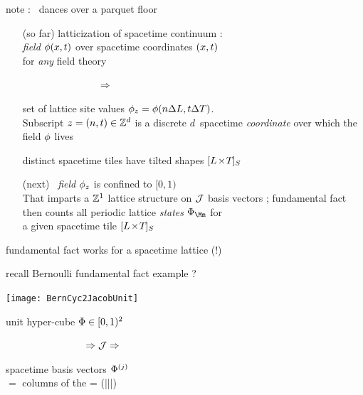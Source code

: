 \begin{frame}{note : \catlatt\ dances over a parquet floor}
\begin{itemize}
  \item[(so far)]
latticization of spacetime continuum :\\
{\color{blue}\emph{field}} $\ssp(x,\zeit)$ over spacetime coordinates
$(x,\zeit)$\\ for {\color{blue}\emph{any}} field theory

~~~~~~~~~~~~~~~$\Rightarrow$

set of lattice site values $\ssp_z=\ssp(n\Delta{L},\zeit\Delta{T})$.\\
Subscript $z=(n,\zeit)\in\integers^d$ is a discrete $d$\dmn\
spacetime {\color{blue}\emph{coordinate}} over which the field $\ssp$ lives
\medskip

distinct spacetime tiles have tilted shapes
$\LTS{}{}{}$
\bigskip

  \item[(next)]
\catlatt\ {\color{blue}\emph{field}} $\ssp_{z}$ is confined to $[0,1)$\\
That imparts a $\integers^1$ lattice structure on {\fundPip} $\jMorb$
basis vectors ; fundamental fact then counts all periodic
{\color{blue}lattice \emph{states}} $\Xx_\Mm$ for \\
a given spacetime tile
$\LTS{}{}{}$
\end{itemize}
\end{frame} %


\begin{frame}{fundamental fact works for a spacetime lattice (!)}

    \begin{block}{recall Bernoulli fundamental fact example ?}
\begin{center}
            \begin{minipage}[c]{0.32\textwidth}\begin{center}
\texttt{[image: BernCyc2JacobUnit]}
            \end{center}\end{minipage}
            \hspace{2ex}
            \begin{minipage}[c]{0.46\textwidth}
unit hyper-cube $\Xx\in[0,1)^2$
\medskip

~~~~~~~~~~~~~~~~$\Rightarrow\jMorb\Rightarrow$
\medskip

{\fundPip}
            \end{minipage}
\end{center}
    \end{block}

\vfill

spacetime {\fundPip} basis
vectors $\jEigvec[j]$ \\
$=$ columns of the {\color{blue}\jacobianOrb}
\beq
\jMorb = (\jEigvec[1]|\jEigvec[2]|\cdots|\jEigvec[\speriod{}\period{}])
\ee{lattJac}
\end{frame} %


